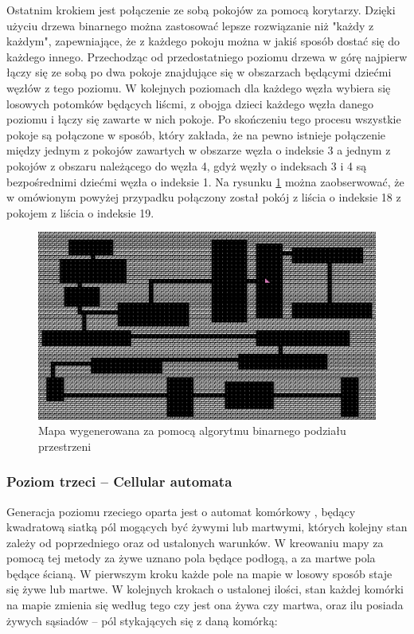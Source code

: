 \documentclass[12pt,twoside]{article}
\begin{document}
Ostatnim krokiem jest połączenie ze sobą pokojów za pomocą korytarzy. Dzięki użyciu drzewa binarnego można zastosować lepsze rozwiązanie niż "każdy z każdym", zapewniające, że z każdego pokoju można w jakiś sposób dostać się do każdego innego. Przechodząc od przedostatniego poziomu drzewa w górę najpierw łączy się ze sobą po dwa pokoje znajdujące się w obszarzach będącymi dziećmi węzłów z tego poziomu. W kolejnych poziomach dla każdego węzła wybiera się losowych potomków będących liścmi, z obojga dzieci każdego węzła danego poziomu i łączy się zawarte w nich pokoje. Po skończeniu tego procesu wszystkie pokoje są połączone w sposób, który zakłada, że na pewno istnieje połączenie między jednym z pokojów zawartych w obszarze węzła o indeksie 3 a jednym z pokojów z obszaru należącego do węzła 4, gdyż węzły o indeksach 3 i 4 są bezpośrednimi dziećmi węzła o indeksie 1. Na rysunku \ref{generators:bsp_done} można zaobserwować, że w omówionym powyżej przypadku połączony został pokój z liścia o indeksie 18 z pokojem z liścia o indeksie 19.

\FloatBarrier
\begin{figure}[h]
	\centering
	\includegraphics[width=14cm]{images/generators/bsp_done.png}
	\caption{Mapa wygenerowana za pomocą algorytmu binarnego podziału przestrzeni}
	\label{generators:bsp_done}
\end{figure}
\FloatBarrier


\subsubsection{Poziom trzeci -- Cellular automata}
Generacja poziomu rzeciego oparta jest o automat komórkowy \cite{book_ca}, będący kwadratową siatką pól mogących być żywymi lub martwymi, których kolejny stan zależy od poprzedniego oraz od ustalonych warunków. W kreowaniu mapy za pomocą tej metody za żywe uznano pola będące podłogą, a za martwe pola będące ścianą. W pierwszym kroku każde pole na mapie w losowy sposób staje się żywe lub martwe. W kolejnych krokach o ustalonej ilości, stan każdej komórki na mapie zmienia się według tego czy jest ona żywa czy martwa, oraz ilu posiada żywych sąsiadów -- pól stykających się z daną komórką:
\end{document}
